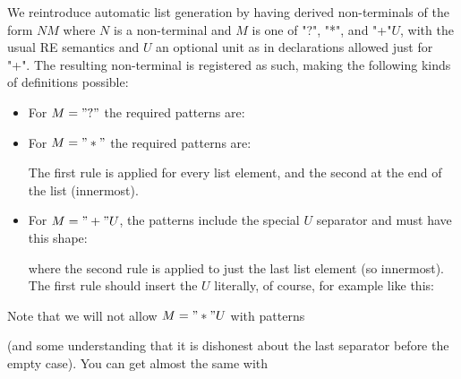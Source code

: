 \documentclass[11pt]{article} %
\begin{document}
We reintroduce automatic list generation by having derived non-terminals of the form $NM$
where $N$ is a non-terminal and $M$ is one of "?", "*", and "+"$U$, with the usual RE semantics
and $U$ an optional unit as in  declarations allowed just for "+". The resulting
non-terminal is registered as such, making the following kinds of definitions possible:
\begin{itemize}

\item For $M="?"$ the required patterns are:

\item For $M="*"$ the required patterns are:
  The first rule is applied for every list element, and the second at the end of the list
  (innermost).

\item For $M="+"U$, the patterns include the special $U$ separator and must have this shape:
  where the second rule is applied to just the last list element (so innermost). The first rule
  should insert the $U$ literally, of course, for example like this:

\end{itemize}
Note that we will not allow $M="*"U$ with patterns
(and some understanding that it is dishonest about the last separator before the empty case). You
can get almost the same with
\end{document}
